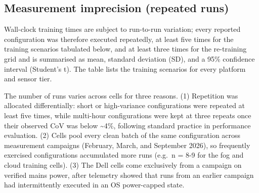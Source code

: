 \documentclass[
  10pt, ]{article}
\begin{document}
\hypertarget{measurement-imprecision-repeated-runs}{%
\subsection{Measurement imprecision (repeated
runs)}\label{measurement-imprecision-repeated-runs}}

Wall-clock training times are subject to run-to-run variation; every reported configuration was therefore executed repeatedly, at least five times for the training scenarios tabulated below, and at least three times for the re-training grid and is summarised as mean, standard deviation (SD), and a 95\% confidence interval (Student's t). The table lists the training scenarios for every platform and sensor tier.

The number of runs varies across cells for three reasons. (1) Repetition was allocated differentially: short or high-variance configurations were repeated at least five times, while multi-hour configurations were kept at three repeats once their observed CoV was below \textasciitilde4\%, following standard practice in performance evaluation. (2) Cells pool every clean batch of the same configuration across measurement campaigns (February, March, and September 2026), so frequently exercised configurations accumulated more runs (e.g.~n = 8-9 for the fog and cloud training cells). (3) The Dell cells come exclusively from a campaign on verified mains power, after telemetry showed that runs from an earlier campaign had intermittently executed in an OS power-capped state.
\end{document}
